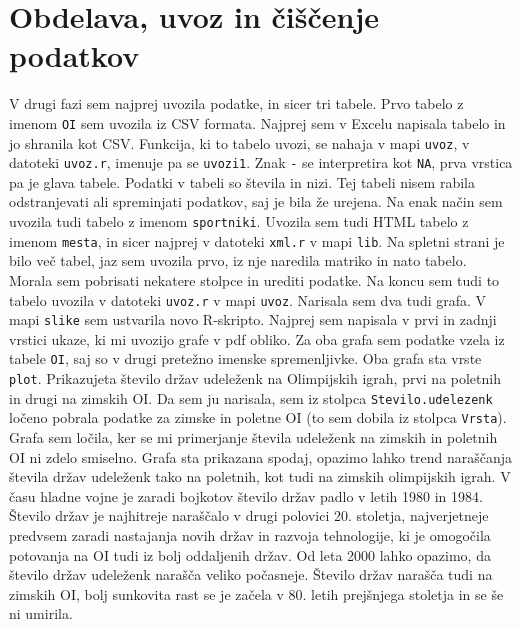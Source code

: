 \documentclass[11pt,a4paper]{article}
\begin{document}
\section{Obdelava, uvoz in čiščenje podatkov}
V drugi fazi sem najprej uvozila podatke, in sicer tri tabele. Prvo tabelo z imenom \verb|OI| sem uvozila iz CSV formata. Najprej sem v Excelu napisala tabelo in jo shranila kot CSV. Funkcija, ki to tabelo uvozi, se nahaja v mapi \verb|uvoz|, v datoteki \verb|uvoz.r|, imenuje pa se \verb|uvozi1|. Znak \verb|-| se interpretira kot \verb|NA|, prva vrstica pa je glava tabele. Podatki v tabeli so števila in nizi. Tej tabeli nisem rabila odstranjevati  ali spreminjati podatkov, saj je bila že urejena.
\newline
Na enak način sem uvozila tudi tabelo z imenom \verb|sportniki|.
\newline
Uvozila sem tudi HTML tabelo z imenom \verb|mesta|, in sicer najprej v datoteki \verb|xml.r| v mapi \verb|lib|. Na spletni strani je bilo več tabel, jaz sem uvozila prvo, iz nje naredila matriko in nato tabelo. Morala sem pobrisati nekatere stolpce in urediti podatke. Na koncu sem tudi to tabelo uvozila v datoteki \verb|uvoz.r| v mapi \verb|uvoz|.
\newline
Narisala sem dva tudi grafa. V mapi \verb|slike| sem ustvarila novo R-skripto. Najprej sem napisala v prvi in zadnji vrstici ukaze, ki mi uvozijo grafe v pdf obliko. Za oba grafa sem podatke vzela iz tabele \verb|OI|, saj so v drugi pretežno imenske spremenljivke.
Oba grafa sta vrste \verb|plot|. Prikazujeta število držav udeleženk na Olimpijskih igrah, prvi na poletnih in drugi na zimskih OI. Da sem ju narisala, sem iz stolpca \verb|Stevilo.udelezenk| ločeno pobrala podatke za zimske in poletne OI (to sem dobila iz stolpca \verb|Vrsta|). Grafa sem ločila, ker se mi primerjanje števila udeleženk na zimskih in poletnih OI ni zdelo smiselno.
\newline
Grafa sta prikazana spodaj, opazimo lahko trend naraščanja števila držav udeleženk tako na poletnih, kot tudi na zimskih olimpijskih igrah. V času hladne vojne je zaradi bojkotov število držav padlo v letih 1980 in 1984. Število držav je najhitreje naraščalo v drugi polovici 20. stoletja, najverjetneje predvsem zaradi nastajanja novih držav in razvoja tehnologije, ki je omogočila potovanja na OI tudi iz bolj oddaljenih držav. Od leta 2000 lahko opazimo, da število držav udeleženk narašča veliko počasneje. \newline
Število držav narašča tudi na zimskih OI, bolj sunkovita rast se je začela v 80. letih prejšnjega stoletja in se še ni umirila.
 
\end{document}

